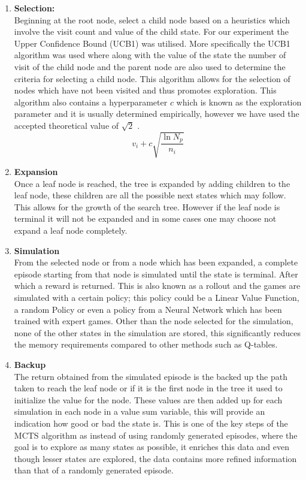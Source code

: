 \documentclass[a4paper,12pt,table]{article}
\begin{document}
\begin{enumerate}
    \item \textbf{Selection:} \\
    Beginning at the root node, select a child node based on a heuristics which involve the visit count and value of the child state. For our experiment the Upper Confidence Bound (UCB1) was utilised. More specifically the UCB1 algorithm was used where along with the value of the state the number of visit of the child node and the parent node are also used to determine the criteria for selecting a child node. This algorithm allows for the selection of nodes which have not been visited and thus promotes exploration. This algorithm also contains a hyperparameter $c$ which is known as the exploration parameter and it is usually determined empirically, however we have used the accepted theoretical value of $\sqrt{2}$ \cite{Reinforcement learning: An introduction}.
    \[v_i + c\sqrt{\frac{\ln{N_p}}{n_i}}  \] 
    
    \item \textbf{Expansion} \\
    Once a leaf node is reached, the tree is expanded by adding children to the leaf node, these children are all the possible next states which may follow. This allows for the growth of the search tree. However if the leaf node is terminal it will not be expanded and in some cases one may choose not expand a leaf node completely.
    
    \item \textbf{Simulation} \\
    From the selected node or from a node which has been expanded, a complete episode starting from that node is simulated until the state is terminal. After which a reward is returned. This is also known as a rollout and the games are simulated with a certain policy; this policy could be a Linear Value Function, a random Policy or even a policy from a Neural Network which has been trained with expert games. Other than the node selected for the simulation, none of the other states in the simulation are stored, this significantly reduces the memory requirements compared to other methods such as Q-tables.
    
    \item \textbf{Backup} \\
    The return obtained from the simulated episode is the backed up the path taken to reach the leaf node or if it is the first node in the tree it used to initialize the value for the node. These values are then added up for each simulation in each node in a value sum variable, this will provide an indication how good or bad the state is. This is one of the key steps of the MCTS algorithm as instead of using randomly generated episodes, where the goal is to explore as many states as possible, it enriches this data and even though lesser states are explored, the data contains more refined information than that of a randomly generated episode.
\end{enumerate}
\end{document}
